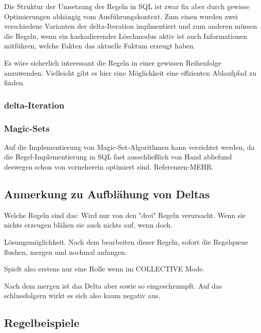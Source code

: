 Die Struktur der Umsetzung der Regeln in SQL ist zwar fix aber durch gewisse Optimierungen abhängig vom Ausführungskontext. Zum einen wurden zwei verschiedene Varianten der delta-Iteration implmentiert und zum anderen müssen die Regeln, wenn ein kaskadierender Löschmodus aktiv ist auch Informationen mitführen, welche Fakten das aktuelle Faktum erzeugt haben.

Es wäre sicherlich interessant die Regeln in einer gewissen Reihenfolge anzuwenden. Vielleicht gibt es hier eine Möglichkeit eine effzienten Ablaufpfad zu finden.

\subsubsection{delta-Iteration}


\subsubsection{Magic-Sets}
Auf die Implementierung von Magic-Set-Algorithmen kann verzichtet werden, da die Regel-Implementierung in SQL fast ausschließlich von Hand abliefund deswegen schon von vorneherein optimiert sind.
Referenzen-MEHR.

\subsection{Anmerkung zu Aufblähung von Deltas}
Welche Regeln sind das:
Wird nur von den "drei" Regeln verursacht. Wenn sie nichts erzeugen blähen sie auch nichts auf, wenn doch.

Lösungsmöglichkeit. Nach dem bearbeiten dieser Regeln, sofort die Regelqueue flushen, mergen und nochmal anfangen.

Spielt also erstens nur eine Rolle wenn im COLLECTIVE Mode.

Nach dem mergen ist das Delta aber sowie so eingeschrumpft. Auf das schlussfolgern wirkt es sich also kaum negativ aus.

\subsection{Regelbeispiele}

